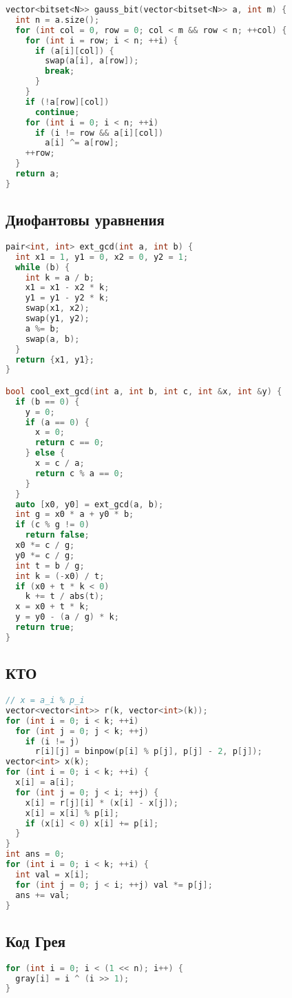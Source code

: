 \documentclass[10pt,a4paper,landscape,twosided]{extarticle}
\begin{document}
\begin{multicols*}{3}
\begin{lstlisting}[language=C++]
vector<bitset<N>> gauss_bit(vector<bitset<N>> a, int m) {
  int n = a.size();
  for (int col = 0, row = 0; col < m && row < n; ++col) {
    for (int i = row; i < n; ++i) {
      if (a[i][col]) {
        swap(a[i], a[row]);
        break;
      }
    }
    if (!a[row][col])
      continue;
    for (int i = 0; i < n; ++i)
      if (i != row && a[i][col])
        a[i] ^= a[row];
    ++row;
  }
  return a;
}
\end{lstlisting}

\subsection{Диофантовы уравнения}
\begin{lstlisting}[language=C++]
pair<int, int> ext_gcd(int a, int b) {
  int x1 = 1, y1 = 0, x2 = 0, y2 = 1;
  while (b) {
    int k = a / b;
    x1 = x1 - x2 * k;
    y1 = y1 - y2 * k;
    swap(x1, x2);
    swap(y1, y2);
    a %= b;
    swap(a, b);
  }
  return {x1, y1};
}

bool cool_ext_gcd(int a, int b, int c, int &x, int &y) {
  if (b == 0) {
    y = 0;
    if (a == 0) {
      x = 0;
      return c == 0;
    } else {
      x = c / a;
      return c % a == 0;
    }
  }
  auto [x0, y0] = ext_gcd(a, b);
  int g = x0 * a + y0 * b;
  if (c % g != 0)
    return false;
  x0 *= c / g;
  y0 *= c / g;
  int t = b / g;
  int k = (-x0) / t;
  if (x0 + t * k < 0)
    k += t / abs(t);
  x = x0 + t * k;
  y = y0 - (a / g) * k;
  return true;
}
\end{lstlisting}

\subsection{КТО}
\begin{lstlisting}[language=C++]
// x = a_i % p_i
vector<vector<int>> r(k, vector<int>(k));
for (int i = 0; i < k; ++i)
  for (int j = 0; j < k; ++j)
    if (i != j)
      r[i][j] = binpow(p[i] % p[j], p[j] - 2, p[j]);
vector<int> x(k);
for (int i = 0; i < k; ++i) {
  x[i] = a[i];
  for (int j = 0; j < i; ++j) {
    x[i] = r[j][i] * (x[i] - x[j]);
    x[i] = x[i] % p[i];
    if (x[i] < 0) x[i] += p[i];
  }
}
int ans = 0;
for (int i = 0; i < k; ++i) {
  int val = x[i];
  for (int j = 0; j < i; ++j) val *= p[j];
  ans += val;
}
\end{lstlisting}

\subsection{Код Грея}
\begin{lstlisting}[language=C++]
for (int i = 0; i < (1 << n); i++) {
  gray[i] = i ^ (i >> 1);
}
\end{lstlisting}


\end{multicols*}
\end{document}
